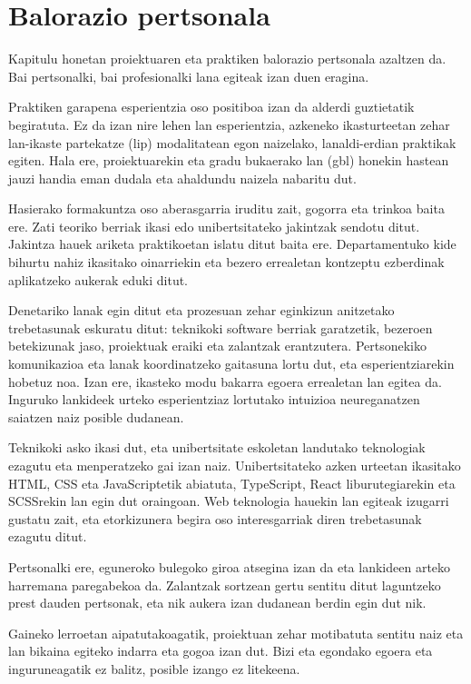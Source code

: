 \chapter{Balorazio pertsonala}


     Kapitulu honetan proiektuaren eta praktiken balorazio pertsonala azaltzen da. Bai pertsonalki, bai profesionalki lana egiteak izan duen eragina.


Praktiken garapena esperientzia oso positiboa izan da alderdi guztietatik begiratuta. Ez da izan nire lehen lan esperientzia, azkeneko ikasturteetan zehar lan-ikaste partekatze (\acrshort{lip}) modalitatean egon naizelako, lanaldi-erdian praktikak egiten. Hala ere, proiektuarekin eta gradu bukaerako lan (\acrshort{gbl}) honekin hastean jauzi handia eman dudala eta ahaldundu naizela nabaritu dut. 

Hasierako formakuntza oso aberasgarria iruditu zait, gogorra eta trinkoa baita ere. Zati teoriko berriak ikasi edo unibertsitateko jakintzak sendotu ditut. Jakintza hauek ariketa praktikoetan islatu ditut baita ere. Departamentuko kide bihurtu nahiz ikasitako oinarriekin eta bezero errealetan kontzeptu ezberdinak aplikatzeko aukerak eduki ditut. 

Denetariko lanak egin ditut eta prozesuan zehar eginkizun anitzetako trebetasunak eskuratu ditut: teknikoki software berriak garatzetik, bezeroen betekizunak jaso, proiektuak eraiki eta zalantzak erantzutera. Pertsonekiko komunikazioa eta lanak koordinatzeko gaitasuna lortu dut, eta esperientziarekin hobetuz noa. Izan ere, ikasteko modu bakarra egoera errealetan lan egitea da. Inguruko lankideek urteko esperientziaz lortutako intuizioa neureganatzen saiatzen naiz posible dudanean.   

Teknikoki asko ikasi dut, eta unibertsitate eskoletan landutako teknologiak ezagutu eta menperatzeko gai izan naiz. Unibertsitateko azken urteetan ikasitako HTML, CSS eta JavaScriptetik abiatuta,  TypeScript, React liburutegiarekin eta SCSSrekin lan egin dut oraingoan. Web teknologia hauekin lan egiteak izugarri gustatu zait, eta etorkizunera begira oso interesgarriak diren trebetasunak ezagutu ditut.

Pertsonalki ere, eguneroko bulegoko giroa atsegina izan da eta lankideen arteko harremana paregabekoa da. Zalantzak sortzean gertu sentitu ditut laguntzeko prest dauden pertsonak, eta nik aukera izan dudanean berdin egin dut nik. 

Gaineko lerroetan aipatutakoagatik, proiektuan zehar motibatuta sentitu naiz eta lan bikaina egiteko indarra eta gogoa izan dut. Bizi eta egondako egoera eta inguruneagatik ez balitz, posible izango ez litekeena. 
